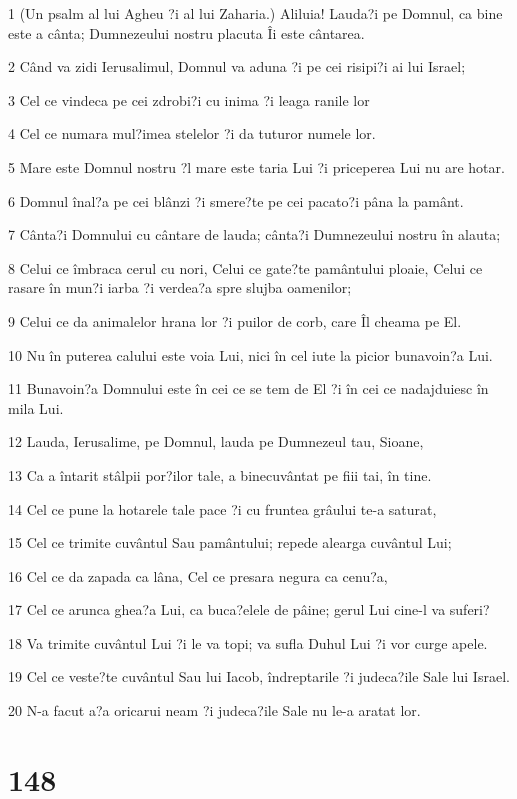 \par 1 (Un psalm al lui Agheu ?i al lui Zaharia.) Aliluia! Lauda?i pe Domnul, ca bine este a cânta; Dumnezeului nostru placuta Îi este cântarea.
\par 2 Când va zidi Ierusalimul, Domnul va aduna ?i pe cei risipi?i ai lui Israel;
\par 3 Cel ce vindeca pe cei zdrobi?i cu inima ?i leaga ranile lor
\par 4 Cel ce numara mul?imea stelelor ?i da tuturor numele lor.
\par 5 Mare este Domnul nostru ?l mare este taria Lui ?i priceperea Lui nu are hotar.
\par 6 Domnul înal?a pe cei blânzi ?i smere?te pe cei pacato?i pâna la pamânt.
\par 7 Cânta?i Domnului cu cântare de lauda; cânta?i Dumnezeului nostru în alauta;
\par 8 Celui ce îmbraca cerul cu nori, Celui ce gate?te pamântului ploaie, Celui ce rasare în mun?i iarba ?i verdea?a spre slujba oamenilor;
\par 9 Celui ce da animalelor hrana lor ?i puilor de corb, care Îl cheama pe El.
\par 10 Nu în puterea calului este voia Lui, nici în cel iute la picior bunavoin?a Lui.
\par 11 Bunavoin?a Domnului este în cei ce se tem de El ?i în cei ce nadajduiesc în mila Lui.
\par 12 Lauda, Ierusalime, pe Domnul, lauda pe Dumnezeul tau, Sioane,
\par 13 Ca a întarit stâlpii por?ilor tale, a binecuvântat pe fiii tai, în tine.
\par 14 Cel ce pune la hotarele tale pace ?i cu fruntea grâului te-a saturat,
\par 15 Cel ce trimite cuvântul Sau pamântului; repede alearga cuvântul Lui;
\par 16 Cel ce da zapada ca lâna, Cel ce presara negura ca cenu?a,
\par 17 Cel ce arunca ghea?a Lui, ca buca?elele de pâine; gerul Lui cine-l va suferi?
\par 18 Va trimite cuvântul Lui ?i le va topi; va sufla Duhul Lui ?i vor curge apele.
\par 19 Cel ce veste?te cuvântul Sau lui Iacob, îndreptarile ?i judeca?ile Sale lui Israel.
\par 20 N-a facut a?a oricarui neam ?i judeca?ile Sale nu le-a aratat lor.

\chapter{148}


